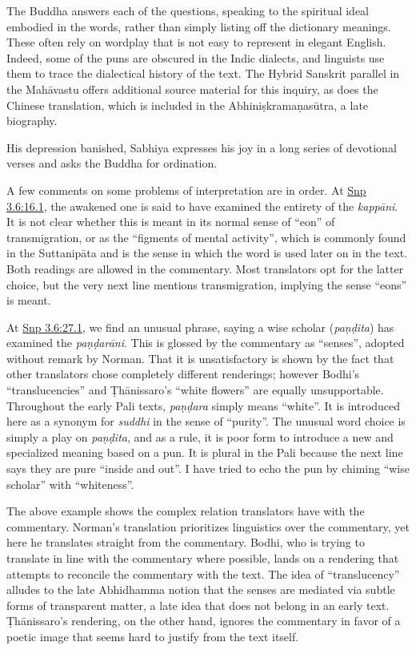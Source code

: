 \documentclass[12pt,openany]{book}%
\begin{document}
The Buddha answers each of the questions, speaking to the spiritual ideal embodied in the words, rather than simply listing off the dictionary meanings. These often rely on wordplay that is not easy to represent in elegant English. Indeed, some of the puns are obscured in the Indic dialects, and linguists use them to trace the dialectical history of the text. The Hybrid Sanskrit parallel in the \textsanskrit{Mahāvastu} offers additional source material for this inquiry, as does the Chinese translation, which is included in the \textsanskrit{Abhiniṣkramaṇasūtra}, a late biography.

His depression banished, Sabhiya expresses his joy in a long series of devotional verses and asks the Buddha for ordination.

A few comments on some problems of interpretation are in order. At \href{https://suttacentral.net/snp3.6/en/sujato\#16.1}{Snp 3.6:16.1}, the awakened one is said to have examined the entirety of the \textit{\textsanskrit{kappāni}}. It is not clear whether this is meant in its normal sense of “eon” of transmigration, or as the “figments of mental activity”, which is commonly found in the \textsanskrit{Suttanipāta} and is the sense in which the word is used later on in the text. Both readings are allowed in the commentary. Most translators opt for the latter choice, but the very next line mentions transmigration, implying the sense “eons” is meant.

At \href{https://suttacentral.net/snp3.6/en/sujato\#27.1}{Snp 3.6:27.1}, we find an unusual phrase, saying a wise scholar (\textit{\textsanskrit{paṇḍita}}) has examined the \textit{\textsanskrit{paṇḍarāni}}. This is glossed by the commentary as “senses”, adopted without remark by Norman. That it is unsatisfactory is shown by the fact that other translators chose completely different renderings; however Bodhi’s “translucencies” and \textsanskrit{Ṭhānissaro}’s “white flowers” are equally unsupportable. Throughout the early Pali texts, \textit{\textsanskrit{paṇḍara}} simply means “white”. It is introduced here as a synonym for \textit{suddhi} in the sense of “purity”. The unusual word choice is simply a play on \textit{\textsanskrit{paṇḍita}}, and as a rule, it is poor form to introduce a new and specialized meaning based on a pun. It is plural in the Pali because the next line says they are pure “inside and out”. I have tried to echo the pun by chiming “wise scholar” with “whiteness”. 

The above example shows the complex relation translators have with the commentary. Norman’s translation prioritizes linguistics over the commentary, yet here he translates straight from the commentary. Bodhi, who is trying to translate in line with the commentary where possible, lands on a rendering that attempts to reconcile the commentary with the text. The idea of “translucency” alludes to the late Abhidhamma notion that the senses are mediated via subtle forms of transparent matter, a late idea that does not belong in an early text. \textsanskrit{Ṭhānissaro}’s rendering, on the other hand, ignores the commentary in favor of a poetic image that seems hard to justify from the text itself.
\end{document}
